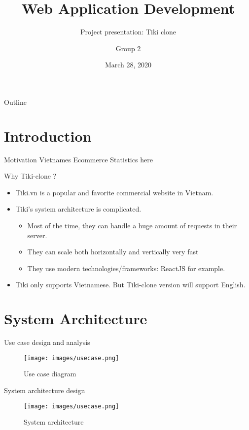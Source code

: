 \documentclass{beamer}
\title[Tiki clone]{Web Application Development}
\author{Group 2}
\subtitle{Project presentation: Tiki clone}
\institute{ICT dept/USTH}
\date{March 28, 2020}
\begin{document}
\begin{frame}
  \titlepage
\end{frame}

\begin{frame}{Outline}
  \tableofcontents
\end{frame}

\section{Introduction}

\begin{frame}{Motivation}
	Vietnames Ecommerce Statistics here
\end{frame}

\begin{frame}{Why Tiki-clone ?}
	\begin{itemize}
  		\item Tiki.vn is a popular and favorite commercial website in Vietnam.
  		\item Tiki's system architecture is complicated.
  		\begin{itemize}
			\item Most of the time, they can handle a huge amount of requests in their server.
			\item They can scale both horizontally and vertically very fast
			\item They use modern technologies/frameworks: ReactJS for example.
		\end{itemize}
  		\item Tiki only supports Vietnamese. But Tiki-clone version will support English.
	\end{itemize}
\end{frame}

\section{System Architecture}

\begin{frame}{Use case design and analysis}
\begin{figure}[htp]
    \centering
    \texttt{[image: images/usecase.png]}
    \caption{Use case diagram}
    \label{fig:usecase}
\end{figure}
\end{frame}

\begin{frame}{System architecture design}
\begin{figure}[htp]
    \centering
    \texttt{[image: images/usecase.png]}
    \caption{System architecture}
    \label{fig:sysarch}
\end{figure}
\end{frame}
\end{document}
